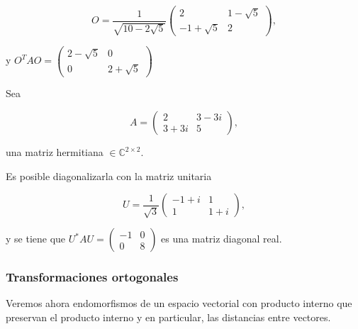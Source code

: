 {\begin{example}
\begin{equation}
O= \frac{1}{\sqrt{10-2\sqrt 5}} \left(\begin{array}{cc} 2 & 1 - \sqrt 5 \\ -1 + \sqrt 5 & 2
\end{array}
 \right), \label{310}
\end{equation}

\bigskip

y $O^T A O =\left(\begin{array}{cc} 2-\sqrt 5 & 0  \\ 0 & 2+\sqrt 5
\end{array}
 \right)  $ 

\end{example}

\bigskip


\bigskip

\begin{example}



Sea 

\begin{equation}
A= \left(\begin{array}{cc} 2 & 3-3i  \\ 3+3i  & 5
\end{array}
 \right), \label{3000}
\end{equation}

\noindent
 una matriz hermitiana $\in \mathbb{C}^{2 \times 2}$.

 \bigskip
Es posible  diagonalizarla con la matriz unitaria 
 
\begin{equation}
U= \frac{1}{\sqrt{3}} \left(\begin{array}{cc} -1+i & 1 \\ 1 & 1+i
\end{array}
 \right), \label{320}
\end{equation}

\bigskip
\noindent
y se tiene que  $U^* A U =\left(\begin{array}{cc} -1 & 0  \\ 0 & 8
\end{array}
 \right)  $ 
es una matriz diagonal real.

\end{example}

\bigskip


\subsubsection{Transformaciones ortogonales}
\label{Transf.Ortogonales}
Veremos ahora endomorfismos de un espacio vectorial con producto interno que preservan el producto interno y en particular, las distancias entre vectores.

}
